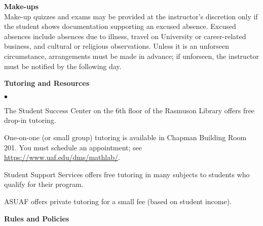 \documentclass[12pt]{article}
\renewcommand{\emph}[1]{\textsf{\textbf{#1}}}
\newcommand{\localhead}[1]{\par\smallskip\textbf{#1}\nobreak\\}%
\def\heading#1{\localhead{\large\emph{#1}}}
\def\subheading#1{\localhead{\emph{#1}}}
\newenvironment{clist}%
{\bgroup\parskip 0pt\begin{list}{$\bullet$}{\partopsep 4pt\topsep 0pt\itemsep -2pt}}%
{\end{list}\egroup}%
\begin{document}
\heading{Make-ups}
Make-up quizzes and exams may be provided at the instructor's discretion only if
the student shows documentation supporting an excused absence. Excused
absences include absences due to illness, travel on University or
career-related business, and cultural or religious
observations. Unless it is an unforseen circumstance, arrangements
must be made in advance; if unforseen, the instructor must be notified
by the following day.


\heading{Tutoring and Resources}
\vskip -30pt\strut
\begin{clist}
	\item The Student Success Center on the 6th floor of the Rasmuson Library offers free drop-in tutoring.
	\item One-on-one (or small group) tutoring is available in 
Chapman Building Room 201. You must schedule an
appointment; see \url{https://www.uaf.edu/dms/mathlab/}.
	\item Student Support Services offers free tutoring in many subjects to students who qualify for their program.
	\item ASUAF offers private tutoring for a small fee (based on student income).
\end{clist}

\heading{Rules and Policies}
\vskip -20pt


\end{document}
